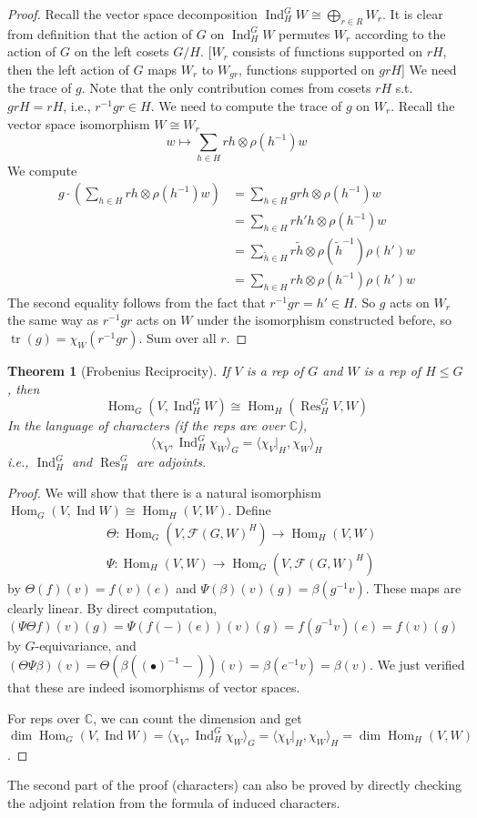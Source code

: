 \documentclass{article}
\theoremstyle{definition}
\theoremstyle{remark}
\theoremstyle{plain}
\newtheorem{thm}[defn]{Theorem}
\newcommand{\CC}{\mathbb{C}}
\newcommand{\Hom}{\operatorname{Hom}}
\newcommand{\Ind}{\operatorname{Ind}}
\begin{document}
\begin{proof}
    Recall the vector space decomposition $\Ind_H^GW\cong\bigoplus_{r\in R}W_r$. It is clear from definition that the action of $G$ on $\Ind_H^GW$ permutes $W_r$ according to the action of $G$ on the left cosets $G/H$. [$W_r$ consists of functions supported on $rH$, then the left action of $G$ maps $W_r$ to $W_{gr}$, functions supported on $grH$] We need the trace of $g$. Note that the only contribution comes from cosets $rH$ s.t. $grH=rH$, i.e., $r^{-1}gr\in H$. We need to compute the trace of $g$ on $W_r$. Recall the vector space isomorphism $W\cong W_r$
    \[w\mapsto \sum_{h\in H}rh\otimes\rho(h^{-1})w\]
    We compute
    \begin{align*}
        g\cdot\left(\sum_{h\in H}rh\otimes\rho(h^{-1})w\right)&=\sum_{h\in H}grh\otimes \rho(h^{-1})w\\
        &=\sum_{h\in H}rh'h\otimes\rho(h^{-1})w\\
        &=\sum_{\tilde h\in H}r\tilde h\otimes\rho(\tilde h^{-1})\rho(h')w\\
        &=\sum_{h\in H}rh\otimes\rho(h^{-1})\rho(h')w
    \end{align*}
    The second equality follows from the fact that $r^{-1}gr=h'\in H$. So $g$ acts on $W_r$ the same way as $r^{-1}gr$ acts on $W$ under the isomorphism constructed before, so $\operatorname{tr}(g)=\chi_{W}(r^{-1}gr)$. Sum over all $r$.
\end{proof}

\begin{thm}[Frobenius Reciprocity]
    If $V$ is a rep of $G$ and $W$ is a rep of $H\le G$, then
    \[\Hom_G(V,\operatorname{Ind}_H^GW)\cong\Hom_H(\operatorname{Res}^G_HV,W)\]
    In the language of characters (if the reps are over $\CC$),
    \[\langle\chi_V,\Ind_H^G\chi_{W}\rangle_G=\langle\chi_{V}|_H,\chi_W\rangle_H\]
    i.e., $\operatorname{Ind}_H^G$ and $\operatorname{Res}^G_H$ are adjoints.
\end{thm}

\begin{proof}
  We will show that there is a natural isomorphism $\Hom_G(V,\Ind W)\cong\Hom_H(V,W)$.
  Define
  \begin{align*}
      &\Theta:\Hom_G(V,\mathcal{F}(G,W)^H)\to\Hom_H(V,W)\\
      &\Psi:\Hom_H(V,W)\to\Hom_G(V,\mathcal{F}(G,W)^H)
  \end{align*}
  by $\Theta(f)(v)=f(v)(e)$ and $\Psi(\beta)(v)(g)=\beta(g^{-1}v)$. These maps are clearly linear.
  By direct computation, $(\Psi\Theta f)(v)(g)=\Psi(f(-)(e))(v)(g)=f(g^{-1}v)(e)=f(v)(g)$ by $G$-equivariance, and $(\Theta\Psi\beta)(v)=\Theta(\beta((\bullet)^{-1}-))(v)=\beta(e^{-1}v)=\beta(v)$. We just verified that these are indeed isomorphisms of vector spaces.

  For reps over $\CC$, we can count the dimension and get $\dim\Hom_G(V,\Ind W)=\langle\chi_V,\Ind_H^G\chi_W\rangle_G=\langle\chi_V|_H,\chi_W\rangle_H=\dim\Hom_H(V,W)$.
\end{proof}
The second part of the proof (characters) can also be proved by directly checking the adjoint relation from the formula of induced characters.
\end{document}

